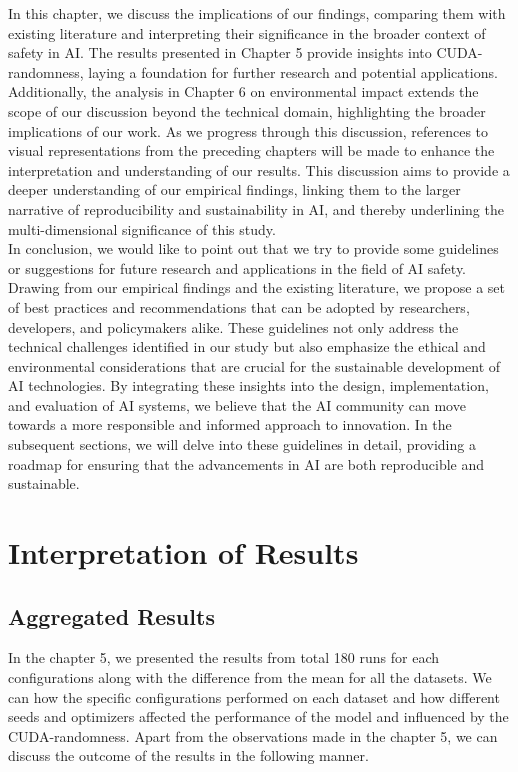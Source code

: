 In this chapter, we discuss the implications of our findings, comparing them with existing literature and interpreting their significance in the broader context of safety in AI. The results presented in Chapter 5 provide insights into CUDA-randomness, laying a foundation for further research and potential applications. Additionally, the analysis in Chapter 6 on environmental impact extends the scope of our discussion beyond the technical domain, highlighting the broader implications of our work. As we progress through this discussion, references to visual representations from the preceding chapters will be made to enhance the interpretation and understanding of our results. This discussion aims to provide a deeper understanding of our empirical findings, linking them to the larger narrative of reproducibility and sustainability in AI, and thereby underlining the multi-dimensional significance of this study.\\

In conclusion, we would like to point out that we try to provide some guidelines or suggestions for future research and applications in the field of AI safety. Drawing from our empirical findings and the existing literature, we propose a set of best practices and recommendations that can be adopted by researchers, developers, and policymakers alike. These guidelines not only address the technical challenges identified in our study but also emphasize the ethical and environmental considerations that are crucial for the sustainable development of AI technologies. By integrating these insights into the design, implementation, and evaluation of AI systems, we believe that the AI community can move towards a more responsible and informed approach to innovation. In the subsequent sections, we will delve into these guidelines in detail, providing a roadmap for ensuring that the advancements in AI are both reproducible and sustainable.
\section{Interpretation of Results}

\subsection{Aggregated Results}
In the chapter 5, we presented the results from total 180 runs for each configurations
along with the difference from the mean for all the datasets. We can how the specific configurations
performed on each dataset and how different seeds and optimizers affected the performance of the model and influenced 
by the CUDA-randomness. Apart from the observations made in the chapter 5, we can discuss the 
outcome of the results in the following manner.\\

